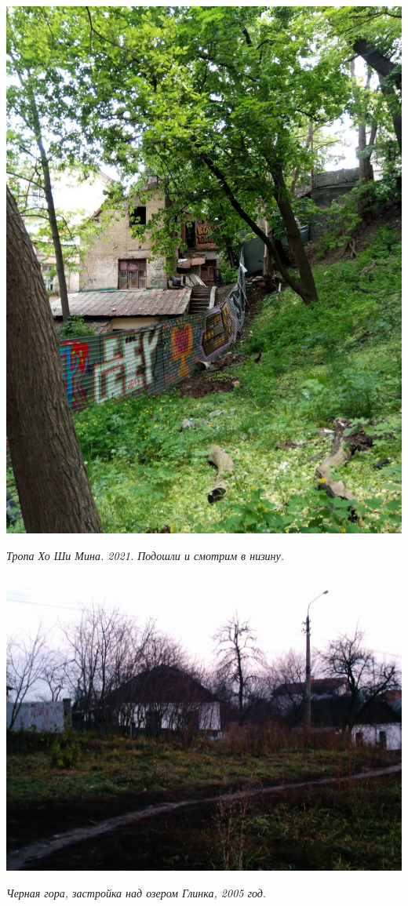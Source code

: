 \begin{center}
\includegraphics[width=\linewidth]{rpix/IMG_20210601_135258.jpg}

\textit{Тропа Хо Ши Мина. 2021. Подошли и смотрим в низину.}
\end{center}


\begin{center}
\includegraphics[width=0.95\linewidth]{rpix/imag0031.jpg}

\textit{Черная гора, застройка над озером Глинка, 2005 год.}
\end{center}


